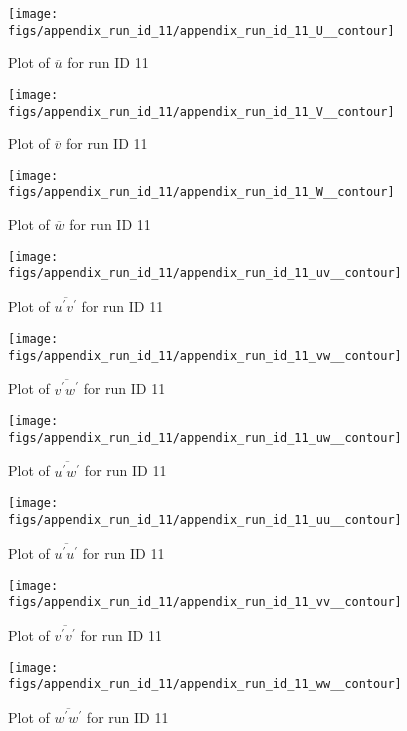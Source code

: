 \begin{figure}[H]
\centering
\texttt{[image: figs/appendix\_run\_id\_11/appendix\_run\_id\_11\_U\_\_contour]}
\caption{Plot of $\overline{u}$ for run ID 11}
\label{fig:appendix_run_id_11_U__contour}
\end{figure}


\begin{figure}[H]
\centering
\texttt{[image: figs/appendix\_run\_id\_11/appendix\_run\_id\_11\_V\_\_contour]}
\caption{Plot of $\overline{v}$ for run ID 11}
\label{fig:appendix_run_id_11_V__contour}
\end{figure}


\begin{figure}[H]
\centering
\texttt{[image: figs/appendix\_run\_id\_11/appendix\_run\_id\_11\_W\_\_contour]}
\caption{Plot of $\overline{w}$ for run ID 11}
\label{fig:appendix_run_id_11_W__contour}
\end{figure}


\begin{figure}[H]
\centering
\texttt{[image: figs/appendix\_run\_id\_11/appendix\_run\_id\_11\_uv\_\_contour]}
\caption{Plot of $\overline{u^\prime v^\prime}$ for run ID 11}
\label{fig:appendix_run_id_11_uv__contour}
\end{figure}


\begin{figure}[H]
\centering
\texttt{[image: figs/appendix\_run\_id\_11/appendix\_run\_id\_11\_vw\_\_contour]}
\caption{Plot of $\overline{v^\prime w^\prime}$ for run ID 11}
\label{fig:appendix_run_id_11_vw__contour}
\end{figure}


\begin{figure}[H]
\centering
\texttt{[image: figs/appendix\_run\_id\_11/appendix\_run\_id\_11\_uw\_\_contour]}
\caption{Plot of $\overline{u^\prime w^\prime}$ for run ID 11}
\label{fig:appendix_run_id_11_uw__contour}
\end{figure}


\begin{figure}[H]
\centering
\texttt{[image: figs/appendix\_run\_id\_11/appendix\_run\_id\_11\_uu\_\_contour]}
\caption{Plot of $\overline{u^\prime u^\prime}$ for run ID 11}
\label{fig:appendix_run_id_11_uu__contour}
\end{figure}


\begin{figure}[H]
\centering
\texttt{[image: figs/appendix\_run\_id\_11/appendix\_run\_id\_11\_vv\_\_contour]}
\caption{Plot of $\overline{v^\prime v^\prime}$ for run ID 11}
\label{fig:appendix_run_id_11_vv__contour}
\end{figure}


\begin{figure}[H]
\centering
\texttt{[image: figs/appendix\_run\_id\_11/appendix\_run\_id\_11\_ww\_\_contour]}
\caption{Plot of $\overline{w^\prime w^\prime}$ for run ID 11}
\label{fig:appendix_run_id_11_ww__contour}
\end{figure}


